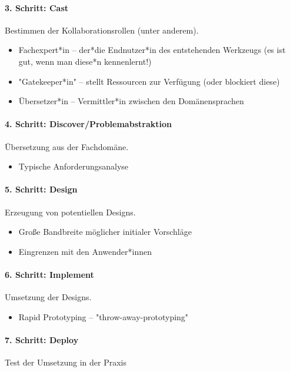 			\paragraph{3. Schritt: Cast}
			Bestimmen der Kollaborationsrollen (unter anderem).
			\begin{itemize}
				\item Fachexpert*in -- der*die Endnutzer*in des entstehenden Werkzeugs (es ist gut, wenn man diese*n kennenlernt!)
				\item "Gatekeeper*in" -- stellt Ressourcen zur Verfügung (oder blockiert diese)
				\item Übersetzer*in -- Vermittler*in zwischen den Domänensprachen
			\end{itemize}

			\paragraph{4. Schritt: Discover/Problemabstraktion}
			Übersetzung aus der Fachdomäne.
			\begin{itemize}
				\item Typische Anforderungsanalyse
			\end{itemize}

			\paragraph{5. Schritt: Design}
			Erzeugung von potentiellen Designs.
			\begin{itemize}
				\item Große Bandbreite möglicher initialer Vorschläge
				\item Eingrenzen mit den Anwender*innen
			\end{itemize}

			\paragraph{6. Schritt: Implement}
			Umsetzung der Designs.
			\begin{itemize}
				\item Rapid Prototyping -- "throw-away-prototyping"
			\end{itemize}

			\paragraph{7. Schritt: Deploy}
			Test der Umsetzung in der Praxis

